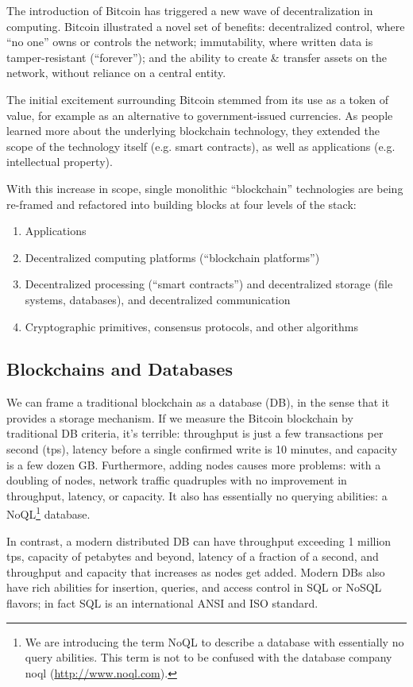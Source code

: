 The introduction of Bitcoin \cite{nakamoto2009bitcoin} has triggered a new wave of decentralization in computing. 
Bitcoin illustrated a novel set of benefits: decentralized control, where ``no one'' owns or controls the network; immutability,
where written data is tamper-resistant (``forever''); and the ability to create \& transfer assets on the network, without reliance on a central entity.

The initial excitement surrounding Bitcoin stemmed from its use as a token of value, for example as an alternative to government-issued currencies.
As people learned more about the underlying blockchain technology, they extended the scope of the technology itself (e.g. smart contracts), as well as applications (e.g. intellectual property).

With this increase in scope, single monolithic ``blockchain'' technologies are being re-framed and refactored into building blocks at four levels of the stack:
\begin{enumerate}
 \item Applications
 \item Decentralized computing platforms (``blockchain platforms'')
 \item Decentralized processing (``smart contracts'') and decentralized storage (file systems, databases), and decentralized communication
 \item Cryptographic primitives, consensus protocols, and other algorithms
\end{enumerate}

\subsection{Blockchains and Databases}
We can frame a traditional blockchain as a database (DB), in the sense that it provides a storage mechanism.
If we measure the Bitcoin blockchain by traditional DB criteria, it’s terrible: throughput is just a few transactions per second (tps), latency before a single confirmed write is 10 minutes, and capacity is a few dozen GB.
Furthermore, adding nodes causes more problems: with a doubling of nodes, network traffic quadruples with no improvement in throughput, latency, or capacity.
It also has essentially no querying abilities: a NoQL\footnote{We are introducing the term NoQL to describe a database with essentially no query abilities. This term is not to be confused with the database company noql (\url{http://www.noql.com}).} database.

In contrast, a modern distributed DB can have throughput exceeding 1 million tps, capacity of petabytes and beyond, latency of a fraction of a second, and throughput and capacity that increases as nodes get added.
Modern DBs also have rich abilities for insertion, queries, and access control in SQL or NoSQL flavors; in fact SQL is an international ANSI and ISO standard.


